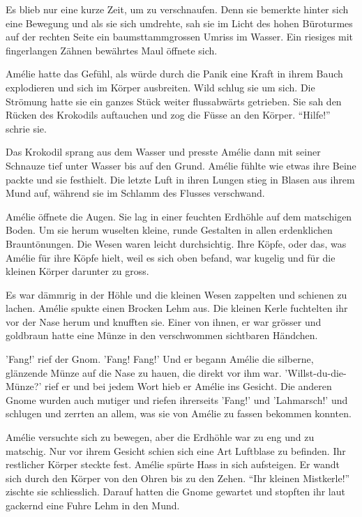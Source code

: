 \documentclass[11pt,titlepage,a5paper]{book}
\begin{document}
Es blieb nur eine kurze Zeit, um zu verschnaufen. Denn sie bemerkte hinter sich eine Bewegung und als sie sich umdrehte, sah sie im Licht des hohen Büroturmes auf der rechten Seite ein baumsttammgrossen Umriss im Wasser. Ein riesiges mit fingerlangen Zähnen bewährtes Maul öffnete sich. 

Amélie hatte das Gefühl, als würde durch die Panik eine Kraft in ihrem Bauch explodieren und sich im Körper ausbreiten. Wild schlug sie um sich. Die Strömung hatte sie ein ganzes Stück weiter flussabwärts getrieben. Sie sah den Rücken des Krokodils auftauchen und zog die Füsse an den Körper. "`Hilfe!"' schrie sie. 

Das Krokodil sprang aus dem Wasser und presste Amélie dann mit seiner Schnauze tief unter Wasser bis auf den Grund. Amélie fühlte wie etwas ihre Beine packte und sie festhielt. Die letzte Luft in ihren Lungen stieg in Blasen aus ihrem Mund auf, während sie im Schlamm des Flusses verschwand.

Amélie öffnete die Augen. Sie lag in einer feuchten Erdhöhle auf dem matschigen Boden. Um sie herum wuselten kleine, runde Gestalten in allen erdenklichen Brauntönungen. Die Wesen waren leicht durchsichtig. Ihre Köpfe, oder das, was Amélie für ihre Köpfe hielt, weil es sich oben befand, war kugelig und für die kleinen Körper darunter zu gross.

Es war dämmrig in der Höhle und die kleinen Wesen zappelten und schienen zu lachen. Amélie spukte einen Brocken Lehm aus. Die kleinen Kerle fuchtelten ihr vor der Nase herum und knufften sie. Einer von ihnen, er war grösser und goldbraun hatte eine Münze in den verschwommen sichtbaren Händchen. 

'Fang!' rief der Gnom. 'Fang! Fang!' Und er begann Amélie die silberne, glänzende Münze auf die Nase zu hauen, die direkt vor ihm war. 'Willst-du-die-Münze?' rief er und bei jedem Wort hieb er Amélie ins Gesicht. Die anderen Gnome wurden auch mutiger und riefen ihrerseits 'Fang!' und 'Lahmarsch!' und schlugen und zerrten an allem, was sie von Amélie zu fassen bekommen konnten.

Amélie versuchte sich zu bewegen, aber die Erdhöhle war zu eng und zu matschig. Nur vor ihrem Gesicht schien sich eine Art Luftblase zu befinden. Ihr restlicher Körper steckte fest. Amélie spürte Hass in sich aufsteigen. Er wandt sich durch den Körper von den Ohren bis zu den Zehen. "`Ihr kleinen Mistkerle!"' zischte sie schliesslich. Darauf hatten die Gnome gewartet und stopften ihr laut gackernd eine Fuhre Lehm in den Mund.
\end{document}
